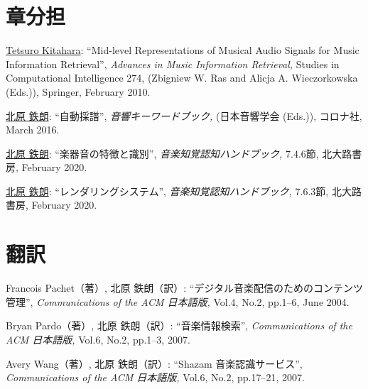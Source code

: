     \section*{章分担}
    \begin{Enumerate}
    
\item 
\underline{Tetsuro Kitahara}: 
    ``Mid-level Representations of Musical Audio Signals for Music Information Retrieval'', 
    {\it Advances in Music Information Retrieval,
    } Studies in Computational Intelligence 274, (Zbigniew W. Ras and Alicja A. Wieczorkowska (Eds.)), Springer, February 2010. 

\item 
\underline{北原 鉄朗}: 
    ``自動採譜'', 
    {\it 音響キーワードブック,
    } (日本音響学会 (Eds.)), コロナ社, March 2016. 

\item 
\underline{北原 鉄朗}: 
    ``楽器音の特徴と識別'', 
    {\it 音楽知覚認知ハンドブック,
    } 7.4.6節, 北大路書房, February 2020. 

\item 
\underline{北原 鉄朗}: 
    ``レンダリングシステム'', 
    {\it 音楽知覚認知ハンドブック,
    } 7.6.3節, 北大路書房, February 2020. 

    \end{Enumerate}
  
\section*{翻訳}
\begin{Enumerate}
  
\item 
Francois Pachet（著）, 
北原 鉄朗（訳）: 
    ``デジタル音楽配信のためのコンテンツ管理'', 
    {\it Communications of the ACM 日本語版,
    } Vol.4, No.2, pp.1--6, June 2004. 

\item 
Bryan Pardo（著）, 
北原 鉄朗（訳）: 
    ``音楽情報検索'', 
    {\it Communications of the ACM 日本語版,
    } Vol.6, No.2, pp.1--3, 2007. 

\item 
Avery Wang（著）, 
北原 鉄朗（訳）: 
    ``Shazam 音楽認識サービス'', 
    {\it Communications of the ACM 日本語版,
    } Vol.6, No.2, pp.17--21, 2007. 

\end{Enumerate}

